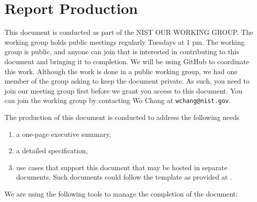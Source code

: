 
\newcommand{\WG}{OUR WORKING GROUP}

\section*{Report Production}


This document is conducted as part of the NIST \WG. The working group
holds public meetings regularly Tuesdays at 1 pm. The
working group is public, and anyone can join that is interested in
contributing to this document and bringing it to completion. We will
be using GitHub to coordinate this work. Although the work is done in
a public working group, we had one member of the group asking to keep
the document private. As such, you need to join our meeting group first
before we grant you access to this document. You can join the working
group by contacting Wo Chang at \verb|wchang@nist.gov|.


The production of this document is conducted to address the following
needs

\begin{enumerate}
  \item a one-page executive summary, 

  \item a detailed specification,

  \item use cases that support this document that may be hosted in
    separate documents. Such documents could follow the template as
    provided at \cite{nist-bigdatawg}.

\end{enumerate}


\parindent0pt We are using the following tools to manage the completion of
the document:

